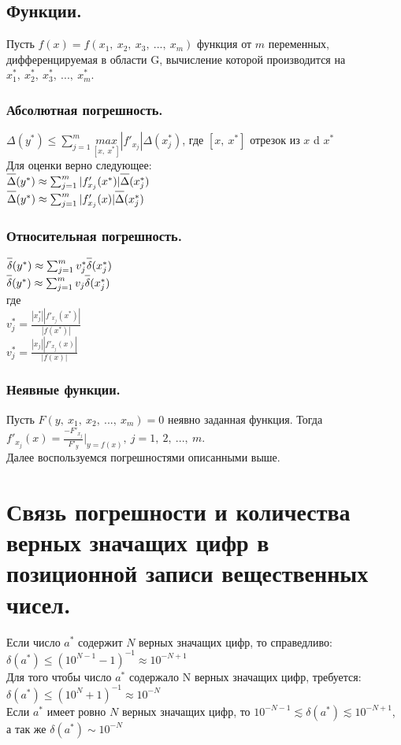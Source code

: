 \documentclass[16pt]{article}
\begin{document}
			\subsection {Функции.}
				Пусть $f(x) = f(x_1,\ x_2,\ x_3,\ ...,\ x_m)$ функция от $m$ переменных, дифференцируемая в области G, вычисление которой производится на $x^{*}_1,\ x^{*}_2,\ x^{*}_3,\ ...,\ x^{*}_m$.\\
				\subsubsection{Абсолютная погрешность.}
				$\Delta(y^{*}) \leq \sum_{j=1}^{m} \underset{[x,\ x^{*}]}{max}|f'_{x_j}|\Delta(x^{*}_j)$, где $[x,\ x^{*}]$ отрезок из $x$ d $x^{*}$\\
				Для оценки верно следующее:\\
				$\overline{\raisebox{3mm}{} \Delta}(y^{*})\approx \sum_{j=1}^{m} |f'_{x_j}(x^{*})|\overline{\raisebox{3mm}{} \Delta}(x^{*}_j)$\\
				$\overline{\raisebox{3mm}{} \Delta}(y^{*})\approx \sum_{j=1}^{m} |f'_{x_j}(x)|\overline{\raisebox{3mm}{} \Delta}(x^{*}_j)$\\
				\subsubsection{Относительная погрешность.}
				$\overline{\raisebox{3mm}{} \delta}(y^{*}) \approx \sum_{j=1}^{m} v^{*}_j \overline{\raisebox{3mm}{} \delta}(x^{*}_j)$\\
				$\overline{\raisebox{3mm}{} \delta}(y^{*}) \approx \sum_{j=1}^{m} v_j \overline{\raisebox{3mm}{} \delta}(x^{*}_j)$\\
				где\\
				$v^{*}_j = \frac{|x^{*}_j||f'_{x_j}(x^{*})|}{|f(x^{*})|}$\\
				$v^{*}_j = \frac{|x_j||f'_{x_j}(x)|}{|f(x)|}$\\
				\subsubsection{Неявные функции.}
				Пусть $F(y,\ x_1,\ x_2,\ ...,\ x_m) = 0 $ неявно заданная функция. Тогда $f'_{x_j}(x) = \frac{-F'_{x_j}}{F'_y}|_{y=f(x)},\ j=1,\ 2,\ ...,\ m.$\\
				Далее воспользуемся погрешностями описанными выше.\\ 
		\section {Связь погрешности и количества верных значащих цифр в позиционной записи вещественных чисел.}
			Если число $a^{*}$ содержит $N$ верных значащих цифр, то справедливо:\\
			$\delta(a^{*}) \leq (10^{N-1} - 1)^{-1} \approx 10^{-N+1}$\\
			Для того чтобы число $a^{*}$ содержало N верных значащих цифр, требуется:\\
			$\delta(a^{*}) \leq (10^{N} + 1)^{-1} \approx 10^{-N}$\\
			Если $a^{*}$ имеет ровно $N$ верных значащих цифр, то $10^{-N-1} \lesssim \delta(a^{*}) \lesssim 10^{-N+1}$, а так же $\delta(a^{*}) \sim 10^{-N}$ 
\end{document}

